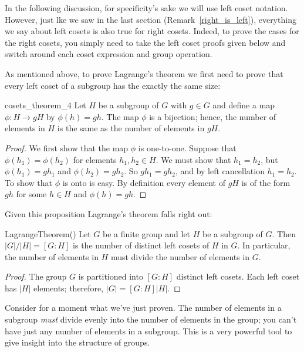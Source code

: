 \begin{rem}\label{left_is_right}
In the following discussion, for specificity's sake we will use  left coset notation. However, just lke we saw in the last section (Remark~\ref{right_is_left}), everything we say about left cosets is also true for right cosets. Indeed, to prove the cases for the right cosets, you simply need to take the left coset proofs given below and switch around each coset expression and group operation.
\end{rem}

As mentioned above, to prove  Lagrange's theorem we first need to prove that every left coset of a subgroup has the exactly the same size:

\begin{prop}{cosets_theorem_4}
Let $H$ be a subgroup of $G$ with $g \in G$ and define a map $\phi:H \rightarrow gH$ by $\phi(h) = gh$.  The map $\phi$ is a bijection; hence, the number of elements in $H$ is the same as the number of elements in $gH$. 
\end{prop}
 
\begin{proof}
We first show that the map $\phi$ is one-to-one.  Suppose that $\phi(h_1)  = \phi(h_2)$ for elements $h_1, h_2 \in H$.  We must show that $h_1 =  h_2$, but $\phi(h_1) = gh_1$ and $\phi(h_2) = gh_2$.  So $gh_1 = gh_2$,  and by left cancellation $h_1= h_2$.  To show that $\phi$ is onto is easy.  By definition every element of $gH$ is of the form $gh$ for some $h \in H$ and $\phi(h) = gh$. 
\end{proof}

Given this proposition Lagrange's theorem falls right out:

\begin{prop}{LagrangeTheorem}()
Let $G$ be a finite group and let $H$ be a subgroup of $G$.  Then $|G|/|H| = [G : H]$ is the number of distinct left cosets of $H$ in $G$.  In particular, the number of elements in $H$ must divide the number of elements in $G$. 
\end{prop}

\begin{proof}
The group $G$ is partitioned into $[G : H]$ distinct left cosets.  Each left coset has $|H|$ elements; therefore, $|G| = [G : H] |H|$.
\end{proof}

Consider for a moment what we've just proven. The number of elements in a subgroup \emph{must} divide evenly into the number of elements in the group; you can't have just any number of elements in a subgroup. This is a very powerful tool to give insight into the structure of groups.

